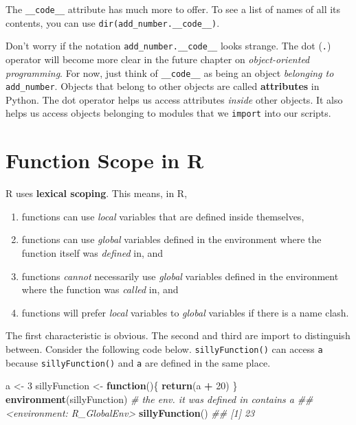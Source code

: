 \documentclass[12pt,krantz2]{krantz}
\makeatletter
\newenvironment{Shaded}{\begin{snugshade}}{\end{snugshade}}
\newcommand{\CommentTok}[1]{\textcolor[rgb]{0.37,0.37,0.37}{\textit{#1}}}
\newcommand{\ControlFlowTok}[1]{\textcolor[rgb]{0.27,0.27,0.27}{\textbf{#1}}}
\newcommand{\DecValTok}[1]{\textcolor[rgb]{0.06,0.06,0.06}{#1}}
\newcommand{\KeywordTok}[1]{\textcolor[rgb]{0.27,0.27,0.27}{\textbf{#1}}}
\newcommand{\NormalTok}[1]{#1}
\newcommand{\OperatorTok}[1]{\textcolor[rgb]{0.43,0.43,0.43}{\textbf{#1}}}
\newcommand{\StringTok}[1]{\textcolor[rgb]{0.5,0.5,0.5}{#1}}
\providecommand{\tightlist}{%
  \setlength{\itemsep}{0pt}\setlength{\parskip}{0pt}}
\newenvironment{kframe}{%
\medskip{}
\setlength{\fboxsep}{.8em}
 \def\at@end@of@kframe{}%
 \ifinner\ifhmode%
  \def\at@end@of@kframe{\end{minipage}}%
  \begin{minipage}{\columnwidth}%
 \fi\fi%
 \def\FrameCommand##1{\hskip\@totalleftmargin \hskip-\fboxsep
 \colorbox{shadecolor}{##1}\hskip-\fboxsep
     \hskip-\linewidth \hskip-\@totalleftmargin \hskip\columnwidth}%
 \MakeFramed {\advance\hsize-\width
   \@totalleftmargin\z@ \linewidth\hsize
   \@setminipage}}%
 {\par\unskip\endMakeFramed%
 \at@end@of@kframe}
\renewenvironment{Shaded}{\begin{kframe}}{\end{kframe}}
\makeatother
\begin{document}
The \texttt{\_\_code\_\_} attribute has much more to offer. To see a list of names of all its contents, you can use \texttt{dir(add\_number.\_\_code\_\_)}.

\begin{rmd-details}
Don't worry if the notation \texttt{add\_number.\_\_code\_\_} looks strange. The dot (\texttt{.}) operator will become more clear in the future chapter on \emph{object-oriented programming}. For now, just think of \texttt{\_\_code\_\_} as being an object \emph{belonging to} \texttt{add\_number}. Objects that belong to other objects are called \textbf{attributes} in Python. The dot operator helps us access attributes \emph{inside} other objects. It also helps us access objects belonging to modules that we \texttt{import} into our scripts.

\end{rmd-details}

\hypertarget{function-scope-in-r}{%
\section{Function Scope in R}\label{function-scope-in-r}}

R uses \textbf{lexical scoping}. This means, in R, 

\begin{enumerate}
\def\labelenumi{\arabic{enumi}.}
\tightlist
\item
  functions can use \emph{local} variables that are defined inside themselves,\\
\item
  functions can use \emph{global} variables defined in the environment where the function itself was \emph{defined} in, and
\item
  functions \emph{cannot} necessarily use \emph{global} variables defined in the environment where the function was \emph{called} in, and
\item
  functions will prefer \emph{local} variables to \emph{global} variables if there is a name clash.
\end{enumerate}

The first characteristic is obvious. The second and third are import to distinguish between. Consider the following code below. \texttt{sillyFunction()} can access \texttt{a} because \texttt{sillyFunction()} and \texttt{a} are defined in the same place.

\begin{Shaded}
\begin{Highlighting}[]
\NormalTok{a <-}\StringTok{ }\DecValTok{3}
\NormalTok{sillyFunction <-}\StringTok{ }\ControlFlowTok{function}\NormalTok{()\{}
  \KeywordTok{return}\NormalTok{(a }\OperatorTok{+}\StringTok{ }\DecValTok{20}\NormalTok{) }
\NormalTok{\}}
\KeywordTok{environment}\NormalTok{(sillyFunction) }\CommentTok{# the env. it was defined in contains a}
\CommentTok{## <environment: R_GlobalEnv>}
\KeywordTok{sillyFunction}\NormalTok{()}
\CommentTok{## [1] 23}
\end{Highlighting}
\end{Shaded}
\end{document}
